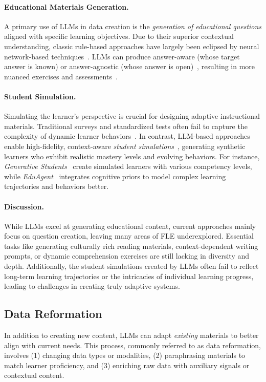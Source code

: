 \paragraph{Educational Materials Generation.} A primary use of LLMs in data creation is the \textit{generation of educational questions} aligned with specific learning objectives. Due to their superior contextual understanding, classic rule-based approaches have largely been eclipsed by neural network-based techniques~\cite{kurdi2020systematic,rathod-etal-2022-educational,mulla2023automatic}. LLMs can produce answer-aware (whose target answer is known) or answer-agnostic (whose answer is open)~\cite{zhang2021review}, resulting in more nuanced exercises and assessments~\cite{xiao-etal-2023-evaluating}.

\paragraph{Student Simulation.} Simulating the learner’s perspective is crucial for designing adaptive instructional materials. Traditional surveys and standardized tests often fail to capture the complexity of dynamic learner behaviors~\cite{kaser2024simulated}. In contrast, LLM-based approaches enable high-fidelity, context-aware \textit{student simulations}~\cite{liu2024personality,yue2024mathvc}, generating synthetic learners who exhibit realistic mastery levels and evolving behaviors. For instance, \textit{Generative Students}~\cite{lu2024generative} create simulated learners with various competency levels, while \textit{EduAgent}~\cite{xu2024eduagent} integrates cognitive priors to model complex learning trajectories and behaviors better.

\paragraph{Discussion.} While LLMs excel at generating educational content, current approaches mainly focus on question creation, leaving many areas of FLE underexplored. Essential tasks like generating culturally rich reading materials, context-dependent writing prompts, or dynamic comprehension exercises are still lacking in diversity and depth. Additionally, the student simulations created by LLMs often fail to reflect long-term learning trajectories or the intricacies of individual learning progress, leading to challenges in creating truly adaptive systems.


\subsection{Data Reformation}
In addition to creating new content, LLMs can adapt \textit{existing} materials to better align with current needs. This process, commonly referred to as data reformation, involves (1) changing data types or modalities, (2) paraphrasing materials to match learner proficiency, and (3) enriching raw data with auxiliary signals or contextual content.

